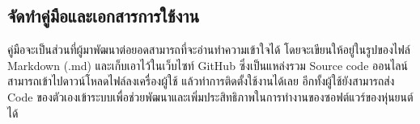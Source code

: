 
\clearpage
\subsection{จัดทำคู่มือและเอกสารการใช้งาน}
คู่มือจะเป็นส่วนที่ผู้มาพัฒนาต่อยอดสามารถที่จะอ่านทำความเข้าใจได้ โดยจะเขียนให้อยู่ในรูปของไฟล์ 
Markdown (.md) และเก็บเอาไว้ในเว็บไซท์ GitHub ซึ่งเป็นแหล่งรวม Source code ออนไลน์
สามารถเข้าไปดาวน์โหลดไฟล์ลงเครื่องผู้ใช้ แล้วทำการติดตั้งใช้งานได้เลย อีกทั้งผู้ใช้ยังสามารถส่ง Code
ของตัวเองเข้าระบบเพื่อช่วยพัฒนาและเพิ่มประสิทธิภาพในการทำงานของซอฟต์แวร์ของหุ่นยนต์ได้


